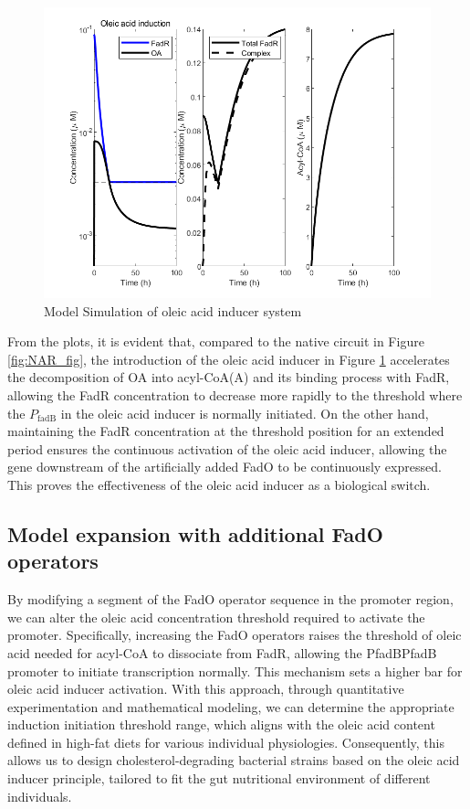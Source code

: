 \documentclass[UTF8]{article}
\begin{document}
\begin{figure}[h]
	\centering
	\includegraphics[width=0.75\linewidth]{figures/PAR_fig.png}
	\caption{Model Simulation of oleic acid inducer system}
	\label{fig:PAR_fig}
\end{figure}

From the plots, it is evident that, compared to the native circuit in Figure \ref{fig:NAR_fig}, the introduction of the oleic acid inducer in Figure \ref{fig:PAR_fig} accelerates the decomposition of OA into acyl-CoA(A) and its binding process with FadR, allowing the FadR concentration to decrease more rapidly to the threshold where the $P_{\mathrm{fadB}}$ in the oleic acid inducer is normally initiated. On the other hand, maintaining the FadR concentration at the threshold position for an extended period ensures the continuous activation of the oleic acid inducer, allowing the gene downstream of the artificially added FadO to be continuously expressed. This proves the effectiveness of the oleic acid inducer as a biological switch.

\subsection{Model expansion with additional FadO operators}

By modifying a segment of the FadO operator sequence in the promoter  region, we can alter the oleic acid concentration threshold required to  activate the promoter. Specifically, increasing the FadO operators  raises the threshold of oleic acid needed for acyl-CoA to dissociate  from FadR, allowing the PfadBPfadB promoter to initiate transcription normally. This mechanism sets a  higher bar for oleic acid inducer activation. With this approach,  through quantitative experimentation and mathematical modeling, we can  determine the appropriate induction initiation threshold range, which  aligns with the oleic acid content defined in high-fat diets for various individual physiologies. Consequently, this allows us to design  cholesterol-degrading bacterial strains based on the oleic acid inducer  principle, tailored to fit the gut nutritional environment of different  individuals.
\end{document}
